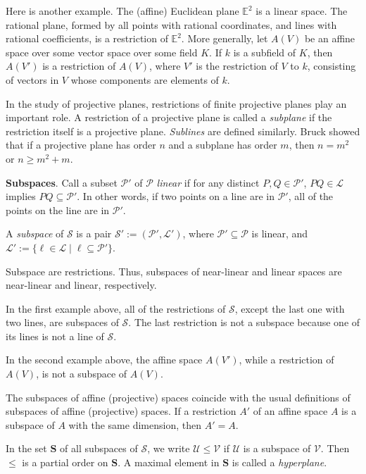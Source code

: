 \documentclass[12pt]{article}
\begin{document}
Here is another example.  The (affine) Euclidean plane $\mathbb{E}^2$ is a linear space.  The rational plane, formed by all points with rational coordinates, and lines with rational coefficients, is a restriction of $\mathbb{E}^2$.  More generally, let $A(V)$ be an affine space over some vector space over some field $K$.  If $k$ is a subfield of $K$, then $A(V')$ is a restriction of $A(V)$, where $V'$ is the restriction of $V$ to $k$, consisting of vectors in $V$ whose components are elements of $k$.

In the study of projective planes, restrictions of finite projective planes play an important role.  A restriction of a projective plane is called a \emph{subplane} if the restriction itself is a projective plane.  \emph{Sublines} are defined similarly.  Bruck showed that if a projective plane has order $n$ and a subplane has order $m$, then $n=m^2$ or $n\ge m^2+m$.

\textbf{Subspaces}.  Call a subset $\mathcal{P}'$ of $\mathcal{P}$ \emph{linear} if for any distinct $P, Q\in \mathcal{P}'$, $PQ\in \mathcal{L}$ implies $PQ \subseteq \mathcal{P}'$.  In other words, if two points on a line are in $\mathcal{P}'$, all of the points on the line are in $\mathcal{P}'$.

A \emph{subspace} of $\mathscr{S}$ is a pair $\mathscr{S}':=(\mathcal{P}',\mathcal{L}')$, where $\mathcal{P}'\subseteq \mathcal{P}$ is linear, and $\mathcal{L}':= \lbrace \ell \in \mathcal{L} \mid \ell\subseteq \mathcal{P}'\rbrace$.

Subspace are restrictions.  Thus, subspaces of near-linear and linear spaces are near-linear and linear, respectively.

In the first example above, all of the restrictions of $\mathscr{S}$, except the last one with two lines, are subspaces of $\mathscr{S}$.  The last restriction is not a subspace because one of its lines is not a line of $\mathscr{S}$.

In the second example above, the affine space $A(V')$, while a restriction of $A(V)$, is not a subspace of $A(V)$.

The subspaces of affine (projective) spaces coincide with the usual definitions of subspaces of affine (projective) spaces.  If a restriction $A'$ of an affine space $A$ is a subspace of $A$ with the same dimension, then $A'=A$.

In the set $\mathbf{S}$ of all subspaces of $\mathscr{S}$, we write $\mathscr{U}\le \mathscr{V}$ if $\mathscr{U}$ is a subspace of $\mathscr{V}$.  Then $\le$ is a partial order on $\mathbf{S}$.  A maximal element in $\mathbf{S}$ is called a \emph{hyperplane}.
\end{document}
